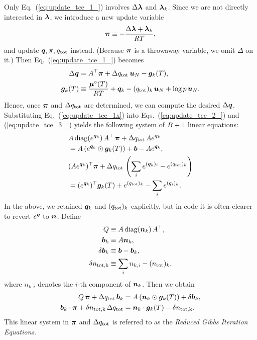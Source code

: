 Only Eq.~(\ref{eq:update_tce_1_}) involves $\Delta \boldsymbol{\lambda}$ and $\boldsymbol{\lambda}_k$. Since we are not directly interested in $\boldsymbol{\lambda}$, we introduce a new update variable
\begin{align}
    \boldsymbol{\pi} \equiv - \frac{\Delta \boldsymbol{\lambda} + \boldsymbol{\lambda}_k}{RT},
\end{align}
and update $\boldsymbol{q}, \boldsymbol{\pi}, q_\mathrm{tot}$ instead. (Because $\boldsymbol{\pi}$ is a throwaway variable, we omit $\Delta$ on it.) Then Eq.~(\ref{eq:update_tce_1_}) becomes
\begin{align}
\label{eq:update_tce_1x}
    \Delta \boldsymbol{q} &=  A^\top \boldsymbol{\pi} + \Delta q_\mathrm{tot} \, \boldsymbol{u}_N - \boldsymbol{g}_k(T), \\
    \boldsymbol{g}_k (T) &\equiv \frac{\boldsymbol{\mu}^\circ(T)}{RT} + {\boldsymbol{q}}_k - (q_\mathrm{tot})_k \, \boldsymbol{u}_N + \log{p} \, \boldsymbol{u}_N .
\end{align}
Hence, once $\boldsymbol{\pi}$ and $\Delta q_\mathrm{tot}$ are determined, we can compute the desired $\Delta \boldsymbol{q}$. Substituting Eq.~(\ref{eq:update_tce_1x}) into Eqs.~(\ref{eq:update_tce_2_}) and (\ref{eq:update_tce_3_}) yields the following system of $B+1$ linear equations:
\begin{align}
    &A \, \mathrm{diag} (e^{\boldsymbol{q}_k}) \, A^\top \, \boldsymbol{\pi} + \Delta q_\mathrm{tot} \, A e^{\boldsymbol{q}_k} \nonumber \\
    &= A \left(e^{\boldsymbol{q}_k} \odot \boldsymbol{g}_k (T) \right) + \boldsymbol{b} - A  e^{\boldsymbol{q}_k}, \\
    &(A  e^{\boldsymbol{q}_k})^\top \boldsymbol{\pi} + \Delta q_\mathrm{tot} \, \left( \sum_i e^{(\boldsymbol{q}_k)_i} - e^{(q_\mathrm{tot})_k} \right) \nonumber \\ 
    &= (e^{\boldsymbol{q}_k})^\top \boldsymbol{g}_k(T) + e^{(q_\mathrm{tot})_k} - \sum_i {e^{(q_i)_k}} .
\end{align}
In the above, we retained $\boldsymbol{q}_k$ and $(q_\mathrm{tot})_k$ explicitly, but in code it is often clearer to revert $e^{\boldsymbol{q}}$ to $\boldsymbol{n}$. Define
\begin{align}
    Q &\equiv  A \, \mathrm{diag} (\boldsymbol{n}_k) \, A^\top, \\
    \boldsymbol{b}_k &\equiv A \boldsymbol{n}_k, \\
    \delta \boldsymbol{b}_k &\equiv \boldsymbol{b} - \boldsymbol{b}_k, \\
     \delta n_\mathrm{tot,k} &\equiv  \sum_i n_{k,i} - (n_\mathrm{tot})_{k},
\end{align}
where $n_{k,i}$ denotes the $i$-th component of $\boldsymbol{n}_k$. Then we obtain
\begin{align}
\label{eq:rgie1}
   Q \, \boldsymbol{\pi} + \Delta q_\mathrm{tot} \, \boldsymbol{b}_k &= A \left( \boldsymbol{n}_k \odot \boldsymbol{g}_k (T) \right) + \delta \boldsymbol{b}_k, \\
\label{eq:rgie2}
\boldsymbol{b}_k \cdot \boldsymbol{\pi} + \delta n_\mathrm{tot, k} \, \Delta q_\mathrm{tot} &= \boldsymbol{n}_k \cdot \boldsymbol{g}_k(T) - \delta n_\mathrm{tot,k}.
\end{align}
This linear system in $\boldsymbol{\pi}$ and $\Delta q_\mathrm{tot}$ is referred to as the \emph{Reduced Gibbs Iteration Equations}.
